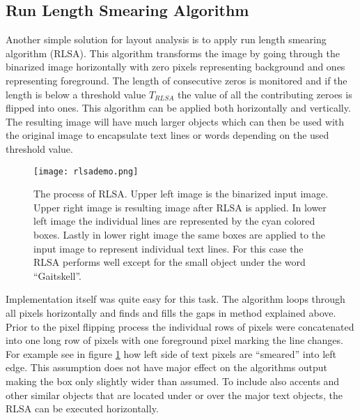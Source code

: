 \documentclass{article}
\begin{document}
        \subsection{Run Length Smearing Algorithm}
          Another simple solution for layout analysis is to apply run length smearing algorithm (RLSA). This algorithm transforms the image by going through the binarized image horizontally with zero pixels representing background and ones representing foreground. The length of consecutive zeros is monitored and if the length is below a threshold value $T_{RLSA}$ the value of all the contributing zeroes is flipped into ones. This algorithm can be applied both horizontally and vertically. The resulting image will have much larger objects which can then be used with the original image to encapsulate text lines or words depending on the used threshold value.

          \begin{figure}[!ht]
            \centering
            \texttt{[image: rlsademo.png]}
            \caption{The process of RLSA. Upper left image is the binarized input image. Upper right image is resulting image after RLSA is applied. In lower left image the individual lines are represented by the cyan colored boxes. Lastly in lower right image the same boxes are applied to the input image to represent individual text lines. For this case the RLSA performs well except for the small object under the word ``Gaitskell''. \label{fig:workingrlsa} }
          \end{figure}

          Implementation itself was quite easy for this task. The algorithm loops through all pixels horizontally and finds and fills the gaps in method explained above. Prior to the pixel flipping process the individual rows of pixels were concatenated into one long row of pixels with one foreground pixel marking the line changes. For example see in figure \ref{fig:workingrlsa} how left side of text pixels are ``smeared'' into left edge. This assumption does not have major effect on the algorithms output making the box only slightly wider than assumed. To include also accents and other similar objects that are located under or over the major text objects, the RLSA can be executed horizontally.
\end{document}
